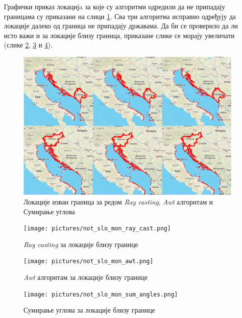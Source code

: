 \documentclass[12pt,oneside]{memoir}
\begin{document}
Графички приказ локацијa за које су алгоритми одредили да не припадају границама су приказани на слици \ref{fig:all_examples_map_slo_mon}. Сва три алгоритма исправно одређују да локације далеко од граница не припадају државама. Да би се проверило да ли исто важи и за локације близу граница, приказане слике се морају увеличати (слике \ref{fig:not_slo_mon_rc}, \ref{fig:not_slo_mon_awt} и \ref{fig:not_slo_mon_sum_angles}).

\begin{figure}[!ht]
  \centering
  \includegraphics[width=1.05\textwidth]{pictures/slo_mon_contains_all_rc_awt_sa.png}
  \caption{Локације изван граница за редом \textit{Ray casting}, \textit{Awt} алгоритам и Сумирање углова}
  \label{fig:all_examples_map_slo_mon}
\end{figure}

\begin{figure}[!ht]
  \centering
  \texttt{[image: pictures/not\_slo\_mon\_ray\_cast.png]}
  \caption{\textit{Ray casting} за локације близу границе}
  \label{fig:not_slo_mon_rc}
\end{figure}

\begin{figure}[!ht]
  \centering
  \texttt{[image: pictures/not\_slo\_mon\_awt.png]}
  \caption{\textit{Awt} алгоритам за локације близу границе}
  \label{fig:not_slo_mon_awt}
\end{figure}

\begin{figure}[!ht]
  \centering
  \texttt{[image: pictures/not\_slo\_mon\_sum\_angles.png]}
  \caption{Сумирање углова за локације близу границе}
  \label{fig:not_slo_mon_sum_angles}
\end{figure}
\end{document}
